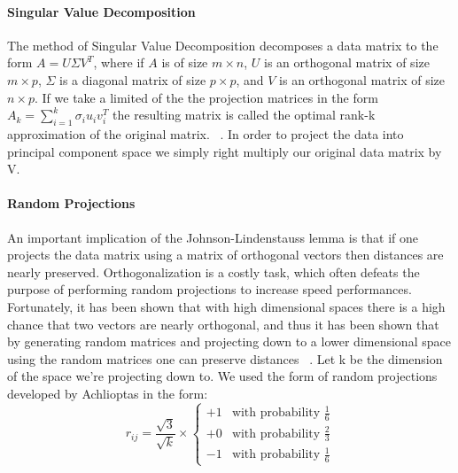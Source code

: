 \paragraph{Singular Value Decomposition} %
\label{par:singular_value_decomposition}
The method of Singular Value Decomposition decomposes a data matrix to the form $A = U \Sigma V^T$, where 
if $A$ is of size $m \times n$, $U$ is an orthogonal matrix of size $m \times p$, $\Sigma$ is a diagonal matrix of size $p \times p$, and $V$ is an orthogonal matrix of size $n \times p$. If we take a limited of the the projection matrices in the form $A_k = \sum_{i=1}^k\sigma_iu_iv_i^T$ the resulting matrix is called the optimal rank-k approximation of the original matrix. ~\cite{LecturePCA}. In order to project the data into principal component space we simply right multiply our original data matrix by V.
\paragraph{Random Projections} %
\label{par:random_projections}
An important implication of the Johnson-Lindenstauss lemma is that if one projects the data matrix using a matrix of orthogonal vectors then distances are nearly preserved. Orthogonalization is a costly task, which often defeats the purpose of performing random projections to increase speed performances. Fortunately, it has been shown that with high dimensional spaces there is a high chance that two vectors are nearly orthogonal, and thus it has been shown that by generating random matrices and projecting down to a lower dimensional space using the random matrices one can preserve distances ~\cite{sulic2010dimensionality}. Let k be the dimension of the space we're projecting down to. We used the form of random projections developed by Achlioptas in the form:
	\begin{equation}
		r_{ij} = \frac{\sqrt{3}}{\sqrt{k}} \times \left\{
			\begin{array}{ll}
				+1  & \mbox{with probability } \frac{1}{6} \\
				+0  & \mbox{with probability } \frac{2}{3} \\
				-1  & \mbox{with probability } \frac{1}{6}
			\end{array}
		\right.
	\end{equation} ~\cite{achlioptas2001database}
